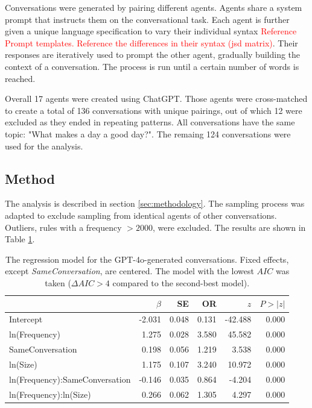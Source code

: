 \documentclass[11pt]{article}
\begin{document}
Conversations were generated by pairing different agents. Agents share a system prompt that instructs them on the conversational task. Each agent is further given a unique language specification to vary their individual syntax \textcolor{red}{Reference Prompt templates. Reference the differences in their syntax (jsd matrix)}. Their responses are iteratively used to prompt the other agent, gradually building the context of a conversation. The process is run until a certain number of words is reached.

Overall 17 agents were created using ChatGPT. Those agents were cross-matched to create a total of 136 conversations with unique pairings, out of which 12 were excluded as they ended in repeating patterns.
All conversations have the same topic: "What makes a day a good day?". The remaing 124 conversations were used for the analysis.

\subsection{Method}
The analysis is described in section \ref{sec:methodology}. The sampling process was adapted to exclude sampling from identical agents of other conversations. Outliers, rules with a frequency $>2000$, were excluded. The results are shown in Table \ref{tab:llm}.

\begin{table}
  \centering
  \begin{tabular}{lrrrrr}
    \hline
    &$\beta$&SE&OR& $z$& $P>|z|$\\
    \hline
    Intercept&
    -2.031&0.048& 0.131&-42.488&0.000\\
    
    ln(Frequency)&
    1.275&0.028&3.580&45.582&0.000\\
    
    SameConversation&
    0.198&0.056&1.219&3.538&0.000\\
    
    ln(Size)&
    1.175&0.107&3.240&10.972&0.000\\
    ln(Frequency):SameConversation&
    -0.146&0.035&0.864&-4.204&0.000\\
    ln(Frequency):ln(Size)&
    0.266&0.062&1.305&4.297&0.000\\
    \hline
    
  \end{tabular}
  \caption{\label{tab:llm}
  The regression model for the GPT-4o-generated conversations. Fixed effects, except \textit{SameConversation}, are centered. The model with the lowest $AIC$ was taken ($\Delta AIC>4$ compared to the second-best model).}
  

\end{table}
\end{document}
